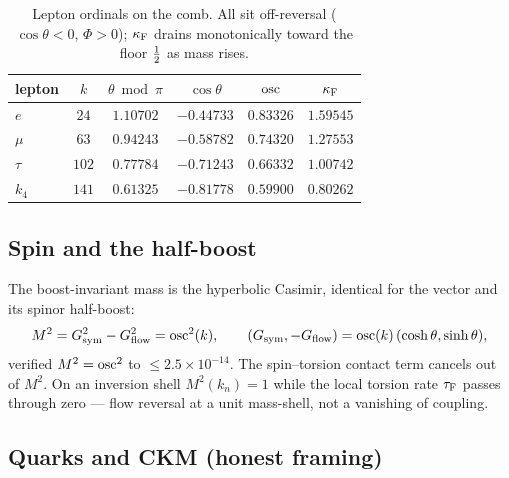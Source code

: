 \begin{table}[ht]\centering
\begin{tabular}{lccccc}
\toprule
lepton & $k$ & $\theta\bmod\pi$ & $\cos\theta$ & $\operatorname{osc}$ & $\kappa_{\mathrm{F}}$ \\
\midrule
$e$    & $24$  & $1.10702$ & $-0.44733$ & $0.83326$ & $1.59545$ \\
$\mu$  & $63$  & $0.94243$ & $-0.58782$ & $0.74320$ & $1.27553$ \\
$\tau$ & $102$ & $0.77784$ & $-0.71243$ & $0.66332$ & $1.00742$ \\
$k_4$  & $141$ & $0.61325$ & $-0.81778$ & $0.59900$ & $0.80262$ \\
\bottomrule
\end{tabular}
\caption{Lepton ordinals on the comb. All sit off-reversal ($\cos\theta<0$,
$\Phi>0$); $\kappa_{\mathrm{F}}$ drains monotonically toward the floor $\tfrac12$ as mass rises.}
\label{tab:particles:leptons}
\end{table}

\subsection{Spin and the half-boost}

The boost-invariant mass is the hyperbolic Casimir, identical for the vector and
its spinor half-boost:
\begin{equation}
M^2=G_{\mathrm{sym}}^2-G_{\mathrm{flow}}^2=\operatorname{osc}^2(k),
\qquad (G_{\mathrm{sym}},-G_{\mathrm{flow}})=\operatorname{osc}(k)\,(\cosh\theta,\sinh\theta),
\label{eq:particles:casimir}
\end{equation}
verified $M^2=\operatorname{osc}^2$ to $\le2.5\times10^{-14}$. The spin--torsion contact term
cancels out of $M^2$. On an inversion shell $M^2(k_n)=1$ while the local torsion
rate $\tau_{\mathrm{F}}$ passes through zero --- flow reversal at a unit mass-shell, not a
vanishing of coupling.

\subsection{Quarks and CKM (honest framing)}

